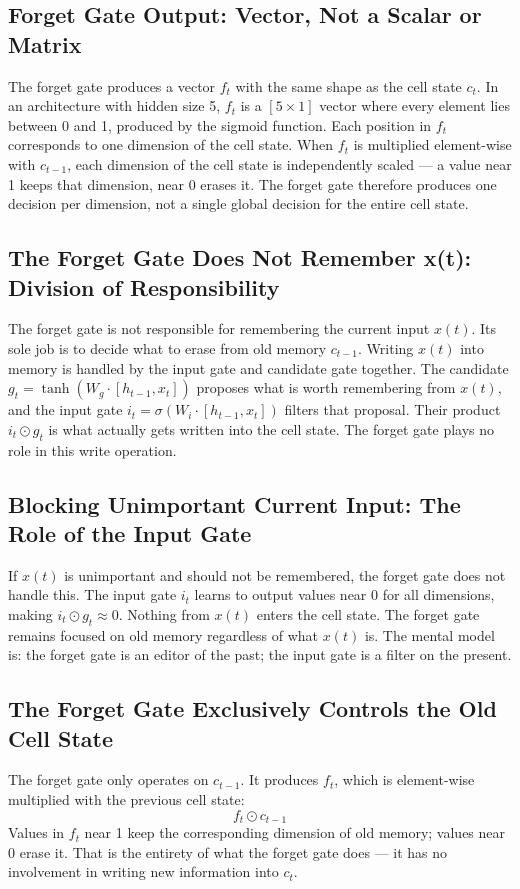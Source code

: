 \subsection{Forget Gate Output: Vector, Not a Scalar or Matrix}
The forget gate produces a vector $f_t$ with the same shape as the cell state $c_t$. In an architecture with hidden size 5, $f_t$ is a $[5 \times 1]$ vector where every element lies between 0 and 1, produced by the sigmoid function. Each position in $f_t$ corresponds to one dimension of the cell state. When $f_t$ is multiplied element-wise with $c_{t-1}$, each dimension of the cell state is independently scaled --- a value near 1 keeps that dimension, near 0 erases it. The forget gate therefore produces one decision per dimension, not a single global decision for the entire cell state.

\subsection{The Forget Gate Does Not Remember x(t): Division of Responsibility}
The forget gate is not responsible for remembering the current input $x(t)$. Its sole job is to decide what to erase from old memory $c_{t-1}$. Writing $x(t)$ into memory is handled by the input gate and candidate gate together. The candidate $g_t = \tanh(W_g \cdot [h_{t-1}, x_t])$ proposes what is worth remembering from $x(t)$, and the input gate $i_t = \sigma(W_i \cdot [h_{t-1}, x_t])$ filters that proposal. Their product $i_t \odot g_t$ is what actually gets written into the cell state. The forget gate plays no role in this write operation.

\subsection{Blocking Unimportant Current Input: The Role of the Input Gate}
If $x(t)$ is unimportant and should not be remembered, the forget gate does not handle this. The input gate $i_t$ learns to output values near 0 for all dimensions, making $i_t \odot g_t \approx 0$. Nothing from $x(t)$ enters the cell state. The forget gate remains focused on old memory regardless of what $x(t)$ is. The mental model is: the forget gate is an editor of the past; the input gate is a filter on the present.

\subsection{The Forget Gate Exclusively Controls the Old Cell State}
The forget gate only operates on $c_{t-1}$. It produces $f_t$, which is element-wise multiplied with the previous cell state:
\[
f_t \odot c_{t-1}
\]
Values in $f_t$ near 1 keep the corresponding dimension of old memory; values near 0 erase it. That is the entirety of what the forget gate does --- it has no involvement in writing new information into $c_t$.

